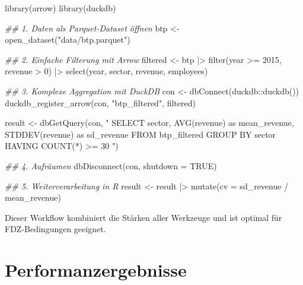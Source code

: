 \documentclass[
  ngerman,
  10pt,
  twocolumn]{article}
\newenvironment{Shaded}{\begin{snugshade}}{\end{snugshade}}
\newcommand{\AttributeTok}[1]{\textcolor[rgb]{0.40,0.45,0.13}{#1}}
\newcommand{\ConstantTok}[1]{\textcolor[rgb]{0.56,0.35,0.01}{#1}}
\newcommand{\DecValTok}[1]{\textcolor[rgb]{0.68,0.00,0.00}{#1}}
\newcommand{\DocumentationTok}[1]{\textcolor[rgb]{0.37,0.37,0.37}{\textit{#1}}}
\newcommand{\FunctionTok}[1]{\textcolor[rgb]{0.28,0.35,0.67}{#1}}
\newcommand{\NormalTok}[1]{\textcolor[rgb]{0.00,0.23,0.31}{#1}}
\newcommand{\OtherTok}[1]{\textcolor[rgb]{0.00,0.23,0.31}{#1}}
\newcommand{\SpecialCharTok}[1]{\textcolor[rgb]{0.37,0.37,0.37}{#1}}
\newcommand{\StringTok}[1]{\textcolor[rgb]{0.13,0.47,0.30}{#1}}
\begin{document}
\begin{Shaded}
\begin{Highlighting}[]
\FunctionTok{library}\NormalTok{(arrow)}
\FunctionTok{library}\NormalTok{(duckdb)}

\DocumentationTok{\#\# 1. Daten als Parquet{-}Dataset öffnen}
\NormalTok{btp }\OtherTok{\textless{}{-}} \FunctionTok{open\_dataset}\NormalTok{(}\StringTok{"data/btp.parquet"}\NormalTok{)}

\DocumentationTok{\#\# 2. Einfache Filterung mit Arrow}
\NormalTok{filtered }\OtherTok{\textless{}{-}}\NormalTok{ btp }\SpecialCharTok{|\textgreater{}}
  \FunctionTok{filter}\NormalTok{(year }\SpecialCharTok{\textgreater{}=} \DecValTok{2015}\NormalTok{, revenue }\SpecialCharTok{\textgreater{}} \DecValTok{0}\NormalTok{) }\SpecialCharTok{|\textgreater{}}
  \FunctionTok{select}\NormalTok{(year, sector, revenue, employees)}

\DocumentationTok{\#\# 3. Komplexe Aggregation mit DuckDB}
\NormalTok{con }\OtherTok{\textless{}{-}} \FunctionTok{dbConnect}\NormalTok{(duckdb}\SpecialCharTok{::}\FunctionTok{duckdb}\NormalTok{())}
\FunctionTok{duckdb\_register\_arrow}\NormalTok{(con, }\StringTok{"btp\_filtered"}\NormalTok{, filtered)}

\NormalTok{result }\OtherTok{\textless{}{-}} \FunctionTok{dbGetQuery}\NormalTok{(con, }\StringTok{"}
\StringTok{  SELECT sector,}
\StringTok{         AVG(revenue) as mean\_revenue,}
\StringTok{         STDDEV(revenue) as sd\_revenue}
\StringTok{  FROM btp\_filtered}
\StringTok{  GROUP BY sector}
\StringTok{  HAVING COUNT(*) \textgreater{}= 30}
\StringTok{"}\NormalTok{)}

\DocumentationTok{\#\# 4. Aufräumen}
\FunctionTok{dbDisconnect}\NormalTok{(con, }\AttributeTok{shutdown =} \ConstantTok{TRUE}\NormalTok{)}

\DocumentationTok{\#\# 5. Weiterverarbeitung in R}
\NormalTok{result }\OtherTok{\textless{}{-}}\NormalTok{ result }\SpecialCharTok{|\textgreater{}} 
  \FunctionTok{mutate}\NormalTok{(}\AttributeTok{cv =}\NormalTok{ sd\_revenue }\SpecialCharTok{/}\NormalTok{ mean\_revenue)}
\end{Highlighting}
\end{Shaded}

Dieser Workflow kombiniert die Stärken aller Werkzeuge und ist optimal
für FDZ-Bedingungen geeignet.

\section{Performanzergebnisse}\label{sec-performance}
\end{document}
